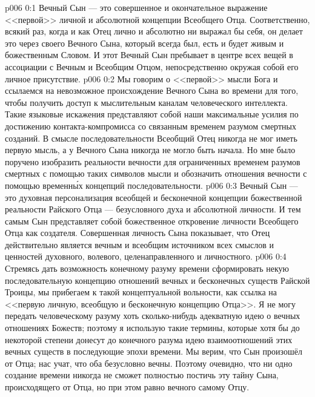 \author{Божественный Советник}
\vs p006 0:1 Вечный Сын --- это совершенное и окончательное выражение <<первой>> личной и абсолютной концепции Всеобщего Отца. Соответственно, всякий раз, когда и как Отец лично и абсолютно ни выражал бы себя, он делает это через своего Вечного Сына, который всегда был, есть и будет живым и божественным Словом. И этот Вечный Сын пребывает в центре всех вещей в ассоциации с Вечным и Всеобщим Отцом, непосредственно окружая собой его личное присутствие.
\vs p006 0:2 Мы говорим о <<первой>> мысли Бога и ссылаемся на невозможное происхождение Вечного Сына во времени для того, чтобы получить доступ к мыслительным каналам человеческого интеллекта. Такие языковые искажения представляют собой наши максимальные усилия по достижению контакта\hyp{}компромисса со связанным временем разумом смертных созданий. В смысле последовательности Всеобщий Отец никогда не мог иметь первую мысль, а у Вечного Сына никогда не могло быть начала. Но мне было поручено изобразить реальности вечности для ограниченных временем разумов смертных с помощью таких символов мысли и обозначить отношения вечности с помощью временн\'ых концепций последовательности.
\vs p006 0:3 Вечный Сын --- это духовная персонализация всеобщей и бесконечной концепции божественной реальности Райского Отца --- безусловного духа и абсолютной личности. И тем самым Сын представляет собой божественное откровение личности Всеобщего Отца как создателя. Совершенная личность Сына показывает, что Отец действительно является вечным и всеобщим источником всех смыслов и ценностей духовного, волевого, целенаправленного и личностного.
\vs p006 0:4 Стремясь дать возможность конечному разуму времени сформировать некую последовательную концепцию отношений вечных и бесконечных существ Райской Троицы, мы прибегаем к такой концептуальной вольности, как ссылка на <<первую личную, всеобщую и бесконечную концепцию Отца>>. Я не могу передать человеческому разуму хоть сколько\hyp{}нибудь адекватную идею о вечных отношениях Божеств; поэтому я использую такие термины, которые хотя бы до некоторой степени донесут до конечного разума идею взаимоотношений этих вечных существ в последующие эпохи времени. Мы верим, что Сын произошёл от Отца; нас учат, что оба безусловно вечны. Поэтому очевидно, что ни одно создание времени никогда не сможет полностью постичь эту тайну Сына, происходящего от Отца, но при этом равно вечного самому Отцу.

